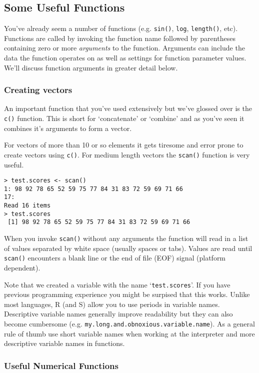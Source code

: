 \documentclass{article}
\begin{document}
\subsection{Some Useful Functions}

You've already seem a number of functions (e.g. \lstinline!sin()!,
\lstinline!log!, \lstinline!length()!, etc). Functions are called by
invoking the function name followed by parentheses containing zero or
more \emph{arguments} to the function. Arguments can include the data
the function operates on as well as settings for function parameter
values. We'll discuss function arguments in greater detail below.

\subsubsection{Creating vectors}

An important function that you've used extensively but we've glossed
over is the \lstinline!c()! function. This is short for `concatenate' or
`combine' and as you've seen it combines it's arguments to form a
vector.

For vectors of more than 10 or so elements it gets tiresome and error
prone to create vectors using \lstinline!c()!. For medium length vectors
the \lstinline!scan()! function is very useful.

\begin{lstlisting}
> test.scores <- scan()
1: 98 92 78 65 52 59 75 77 84 31 83 72 59 69 71 66 
17: 
Read 16 items
> test.scores
 [1] 98 92 78 65 52 59 75 77 84 31 83 72 59 69 71 66
\end{lstlisting}
When you invoke \lstinline!scan()! without any arguments the function
will read in a list of values separated by white space (usually spaces
or tabs). Values are read until \lstinline!scan()! encounters a blank
line or the end of file (EOF) signal (platform dependent).

Note that we created a variable with the name `\lstinline!test.scores!'.
If you have previous programming experience you might be surpised that
this works. Unlike most languages, R (and S) allow you to use periods in
variable names. Descriptive variable names generally improve readability
but they can also become cumbersome (e.g.
\lstinline!my.long.and.obnoxious.variable.name!). As a general rule of
thumb use short variable names when working at the interpreter and more
descriptive variable names in functions.

\subsubsection{Useful Numerical Functions}
\end{document}
